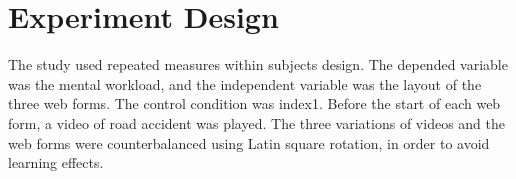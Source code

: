 \documentclass[../main/Feedback.tex]{subfiles}
\begin{document}
\section{Experiment Design}

The study used repeated measures within subjects design. The depended variable was the mental workload, and the independent variable was the layout of the three web forms. The control condition was index1. Before the start of each web form, a video of road accident was played. The three variations of videos and the web forms were counterbalanced using Latin square rotation, in order to avoid learning effects.
\end{document}
